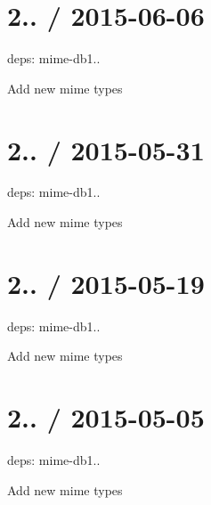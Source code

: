\section*{2.. / 2015-\/06-\/06 }


\begin{DoxyItemize}
\item deps\+: mime-\/db1..
\begin{DoxyItemize}
\item Add new mime types
\end{DoxyItemize}
\end{DoxyItemize}

\section*{2.. / 2015-\/05-\/31 }


\begin{DoxyItemize}
\item deps\+: mime-\/db1..
\begin{DoxyItemize}
\item Add new mime types
\end{DoxyItemize}
\end{DoxyItemize}

\section*{2.. / 2015-\/05-\/19 }


\begin{DoxyItemize}
\item deps\+: mime-\/db1..
\begin{DoxyItemize}
\item Add new mime types
\end{DoxyItemize}
\end{DoxyItemize}

\section*{2.. / 2015-\/05-\/05 }


\begin{DoxyItemize}
\item deps\+: mime-\/db1..
\begin{DoxyItemize}
\item Add new mime types
\end{DoxyItemize}
\end{DoxyItemize}

